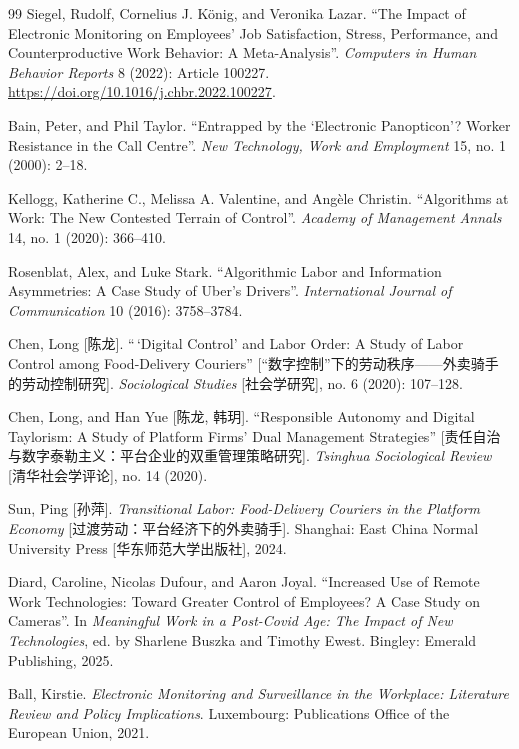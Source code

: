 \documentclass[10pt]{article}
\begin{document}
\begin{thebibliography}{99}
 Siegel, Rudolf, Cornelius J. K\"onig, and Veronika Lazar. ``The Impact of Electronic Monitoring on Employees' Job Satisfaction, Stress, Performance, and Counterproductive Work Behavior: A Meta-Analysis''. \emph{Computers in Human Behavior Reports} 8 (2022): Article 100227. \url{https://doi.org/10.1016/j.chbr.2022.100227}.

 Bain, Peter, and Phil Taylor. ``Entrapped by the `Electronic Panopticon'? Worker Resistance in the Call Centre''. \emph{New Technology, Work and Employment} 15, no. 1 (2000): 2--18.

 Kellogg, Katherine C., Melissa A. Valentine, and Ang\`ele Christin. ``Algorithms at Work: The New Contested Terrain of Control''. \emph{Academy of Management Annals} 14, no. 1 (2020): 366--410.

 Rosenblat, Alex, and Luke Stark. ``Algorithmic Labor and Information Asymmetries: A Case Study of Uber's Drivers''. \emph{International Journal of Communication} 10 (2016): 3758--3784.

 Chen, Long [{\cjkfont 陈龙}]. ``\,`Digital Control' and Labor Order: A Study of Labor Control among Food-Delivery Couriers'' [{\cjkfont “数字控制”下的劳动秩序——外卖骑手的劳动控制研究}]. \emph{Sociological Studies} [{\cjkfont 社会学研究}], no. 6 (2020): 107--128.

 Chen, Long, and Han Yue [{\cjkfont 陈龙, 韩玥}]. ``Responsible Autonomy and Digital Taylorism: A Study of Platform Firms' Dual Management Strategies'' [{\cjkfont 责任自治与数字泰勒主义：平台企业的双重管理策略研究}]. \emph{Tsinghua Sociological Review} [{\cjkfont 清华社会学评论}], no. 14 (2020).

 Sun, Ping [{\cjkfont 孙萍}]. \emph{Transitional Labor: Food-Delivery Couriers in the Platform Economy} [{\cjkfont 过渡劳动：平台经济下的外卖骑手}]. Shanghai: East China Normal University Press [{\cjkfont 华东师范大学出版社}], 2024.

 Diard, Caroline, Nicolas Dufour, and Aaron Joyal. ``Increased Use of Remote Work Technologies: Toward Greater Control of Employees? A Case Study on Cameras''. In \emph{Meaningful Work in a Post-Covid Age: The Impact of New Technologies}, ed. by Sharlene Buszka and Timothy Ewest. Bingley: Emerald Publishing, 2025.

 Ball, Kirstie. \emph{Electronic Monitoring and Surveillance in the Workplace: Literature Review and Policy Implications}. Luxembourg: Publications Office of the European Union, 2021.

\end{thebibliography}
\end{document}
